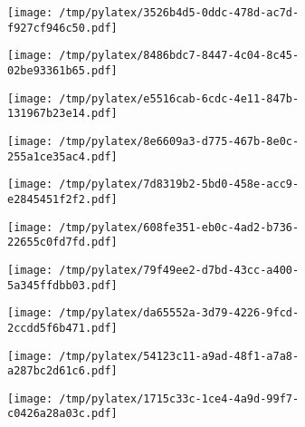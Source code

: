 \documentclass{article}
\begin{document}
\begin{figure}[htbp]
\begin{subfigure}[b]{.3\linewidth}
\texttt{[image: /tmp/pylatex/3526b4d5-0ddc-478d-ac7d-f927cf946c50.pdf]}
\end{subfigure}
\begin{subfigure}[b]{.3\linewidth}
\texttt{[image: /tmp/pylatex/8486bdc7-8447-4c04-8c45-02be93361b65.pdf]}
\end{subfigure}
\begin{subfigure}[b]{.3\linewidth}
\texttt{[image: /tmp/pylatex/e5516cab-6cdc-4e11-847b-131967b23e14.pdf]}
\end{subfigure}
\begin{subfigure}[b]{.3\linewidth}
\texttt{[image: /tmp/pylatex/8e6609a3-d775-467b-8e0c-255a1ce35ac4.pdf]}
\end{subfigure}
\begin{subfigure}[b]{.3\linewidth}
\texttt{[image: /tmp/pylatex/7d8319b2-5bd0-458e-acc9-e2845451f2f2.pdf]}
\end{subfigure}
\begin{subfigure}[b]{.3\linewidth}
\texttt{[image: /tmp/pylatex/608fe351-eb0c-4ad2-b736-22655c0fd7fd.pdf]}
\end{subfigure}
\begin{subfigure}[b]{.3\linewidth}
\texttt{[image: /tmp/pylatex/79f49ee2-d7bd-43cc-a400-5a345ffdbb03.pdf]}
\end{subfigure}
\begin{subfigure}[b]{.3\linewidth}
\texttt{[image: /tmp/pylatex/da65552a-3d79-4226-9fcd-2ccdd5f6b471.pdf]}
\end{subfigure}
\begin{subfigure}[b]{.3\linewidth}
\texttt{[image: /tmp/pylatex/54123c11-a9ad-48f1-a7a8-a287bc2d61c6.pdf]}
\end{subfigure}
\begin{subfigure}[b]{.3\linewidth}
\texttt{[image: /tmp/pylatex/1715c33c-1ce4-4a9d-99f7-c0426a28a03c.pdf]}
\end{subfigure}
\end{figure}
\end{document}
